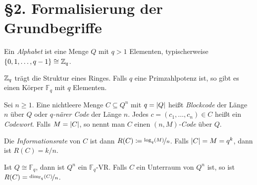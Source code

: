 \documentclass{cheat-sheet}
\newcommand{\F}{\mathbb{F}} %
\begin{document}







\section{§2. Formalisierung der Grundbegriffe}


\begin{defn}
  Ein \emph{Alphabet} ist eine Menge $Q$ mit $q > 1$ Elementen, typischerweise $\{ 0, 1, \ldots, q-1 \} \cong \mathbb{Z}_q$.
\end{defn}

\begin{bem}
  $\mathbb{Z}_q$ trägt die Struktur eines Ringes.
  Falls $q$ eine Primzahlpotenz ist, so gibt es einen Körper $\F_q$ mit $q$ Elementen.
\end{bem}

\begin{defn}
  Sei $n \geq 1$. Eine nichtleere Menge $C \subseteq Q^n$ mit $q = \lvert Q\rvert$ heißt \emph{Blockcode} der Länge $n$ über $Q$ oder \emph{$q$-närer Code} der Länge $n$. Jedes $c = (c_1, \ldots, c_n) \in C$ heißt ein \emph{Codewort}.
  Falls $M = \lvert C\rvert$, so nennt man $C$ einen \emph{$(n, M)$-Code} über $Q$.
\end{defn}

\begin{defn}
  Die \emph{Informationsrate} von $C$ ist dann $R(C) \coloneqq \nicefrac{\log_q(M)}{n}$.
  Falls $\lvert C\rvert = M = q^k$, dann ist $R(C) = k/n$.
\end{defn}

\begin{bem}
  Ist $Q \cong \F_q$, dann ist $Q^n$ ein $\F_q$-VR. Falls $C$ ein Unterraum von $Q^n$ ist, so ist $R(C) = \nicefrac{\dim_{\F_q}(C)}{n}$.
\end{bem}
\end{document}
